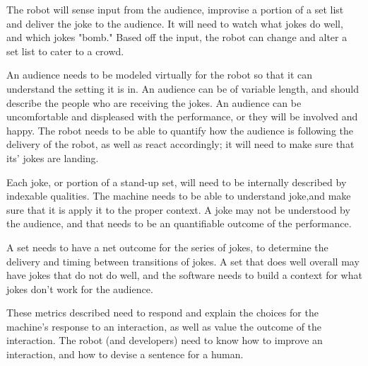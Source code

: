 \documentclass[onecolumn, draftclsnofoot,10pt, compsoc]{IEEEtran}
\begin{document}
The robot will sense input from the audience, improvise a portion of a set list and deliver the joke to the audience. It will need to watch what jokes do well, and which jokes "bomb." Based off the input, the robot can change and alter a set list to cater to a crowd.

An audience needs to be modeled virtually for the robot so that it can understand the setting it is in. An audience can be of variable length, and should describe the people who are receiving the jokes. An audience can be uncomfortable and displeased with the performance, or they will be involved and happy. The robot needs to be able to quantify how the audience is following the delivery of the robot, as well as react accordingly; it will need to make sure that its' jokes are landing.

Each joke, or portion of a stand-up set, will need to be internally described by indexable qualities. The machine needs to be able to understand joke,and make sure that it is apply it to the proper context. A joke may not be understood by the audience, and that needs to be an quantifiable outcome of the performance.

A set needs to have a net outcome for the series of jokes, to determine the delivery and timing between transitions of jokes. A set that does well overall may have jokes that do not do well, and the software needs to build a context for what jokes don't work for the audience.

These metrics described need to respond and explain the choices for the machine's response to an interaction, as well as value the outcome of the interaction. The robot (and developers) need to know how to improve an interaction, and how to devise a sentence for a human.
\end{document}
